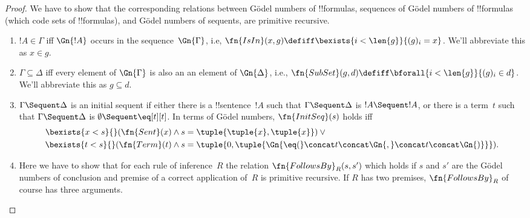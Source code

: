\documentclass[../../../include/open-logic-section]{subfiles}
\begin{document}
\begin{proof}
We have to show that the corresponding relations between G\"odel
numbers of !!{formula}s, sequences of G\"odel numbers of !!{formula}s
(which code sets of !!{formula}s), and G\"odel numbers of sequents,
are primitive recursive.
\begin{enumerate}
\item $!A \in \Gamma$ iff $\Gn{!A}$ occurs in the
  sequence~$\Gn{\Gamma}$, i.e, $\fn{IsIn}(x, g) \defiff \bexists{i <
    \len{g}}{(g)_i = x}$.  We'll abbreviate this as $x \in g$.
\item $\Gamma \subseteq \Delta$ iff every element of $\Gn{\Gamma}$ is
  also an an element of $\Gn{\Delta}$, i.e., $\fn{SubSet}(g, d)
  \defiff \bforall{i < \len{g}}{(g)_i \in d}$.  We'll abbreviate this
  as $g \subseteq d$.
\item $\Gamma \Sequent \Delta$ is an initial sequent if either there
  is a !!{sentence}~$!A$ such that $\Gamma \Sequent \Delta$ is $!A
  \Sequent !A$, or there is a term~$t$ such that $\Gamma \Sequent
  \Delta$ is $\emptyset \Sequent \eq[t][t]$.  In terms of G\"odel
  numbers, $\fn{InitSeq}(s)$ holds iff
\begin{align*}
\bexists{x < s}{} (\fn{Sent}(x) & \land
s = \tuple{\tuple{x},\tuple{x}})
\lor {}\\
\bexists{t<s}{} (\fn{Term}(t) & \land
s = \tuple{0, \tuple{\Gn{{\eq}(} \concat t \concat \Gn{,} \concat t \concat \Gn{)}}}).
\end{align*}
\item Here we have to show that for each rule of inference~$R$ the
  relation $\fn{FollowsBy}_R(s, s')$ which holds if $s$ and $s'$ are
  the G\"odel numbers of conclusion and premise of a correct
  application of~$R$ is primitive recursive.  If $R$ has two premises,
  $\fn{FollowsBy}_R$ of course has three arguments.


\end{enumerate}
\end{proof}
\end{document}
